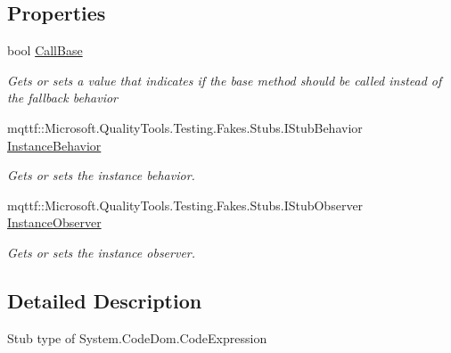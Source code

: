 \subsection*{Properties}
\begin{DoxyCompactItemize}
\item 
bool \hyperlink{class_system_1_1_code_dom_1_1_fakes_1_1_stub_code_expression_a4e3765a5d8be18136c161d16d6cad825}{Call\-Base}
\begin{DoxyCompactList}\small\item\em Gets or sets a value that indicates if the base method should be called instead of the fallback behavior\end{DoxyCompactList}\item 
mqttf\-::\-Microsoft.\-Quality\-Tools.\-Testing.\-Fakes.\-Stubs.\-I\-Stub\-Behavior \hyperlink{class_system_1_1_code_dom_1_1_fakes_1_1_stub_code_expression_af6d913f1a67d02f9c71658b00c67e89e}{Instance\-Behavior}
\begin{DoxyCompactList}\small\item\em Gets or sets the instance behavior.\end{DoxyCompactList}\item 
mqttf\-::\-Microsoft.\-Quality\-Tools.\-Testing.\-Fakes.\-Stubs.\-I\-Stub\-Observer \hyperlink{class_system_1_1_code_dom_1_1_fakes_1_1_stub_code_expression_ac7002f9a26a5dbc4f3dcc74994d3c807}{Instance\-Observer}
\begin{DoxyCompactList}\small\item\em Gets or sets the instance observer.\end{DoxyCompactList}\end{DoxyCompactItemize}


\subsection{Detailed Description}
Stub type of System.\-Code\-Dom.\-Code\-Expression



